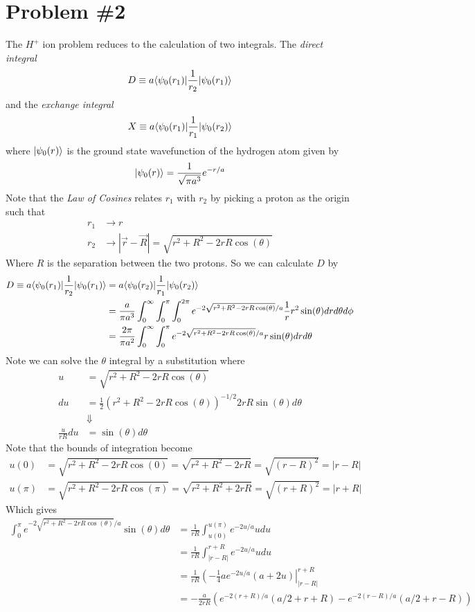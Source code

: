 \documentclass[11pt]{article}
\numberwithin{equation}{section}
\begin{document}
\section{Problem \#2}
The $H^+$ ion problem reduces to the calculation of two integrals. The \emph{direct integral}
$$D\equiv a\langle{\psi_0(r_1)}|\frac{1}{r_2}|{\psi_0(r_1)}\rangle$$
and the \emph{exchange integral}
$$X\equiv a\langle{\psi_0(r_1)}|\frac{1}{r_1}|{\psi_0(r_2)}\rangle$$
where $|{\psi_0(r)}\rangle$ is the ground state wavefunction of the hydrogen atom given by
$$|{\psi_0(r)}\rangle = \frac{1}{\sqrt{\pi a^3}}e^{-r/a}$$
Note that the \emph{Law of Cosines} relates $r_1$ with $r_2$ by picking a proton as the origin such that
\begin{align*}
r_1 &\rightarrow r\\
r_2 &\rightarrow |\vec{r}-\vec{R}| = \sqrt{r^2 + R^2 -2rR\cos(\theta)}
\end{align*}
Where $R$ is the separation between the two protons. So we can calculate $D$ by
\begin{align*}
D\equiv a\langle{\psi_0(r_1)}|\frac{1}{r_2}|{\psi_0(r_1)}\rangle &= a\langle{\psi_0(r_2)}|\frac{1}{r_1}|{\psi_0(r_2)}\rangle\\
&= \frac{a}{\pi a^3}\int_{0}^{\infty}\int_{0}^{\pi}\int_{0}^{2\pi}e^{-2\sqrt{r^2+R^2-2rR\cos(\theta)}/a}\frac{1}{r}r^2\sin(\theta)drd\theta d\phi\\
&= \frac{2\pi}{\pi a^2}\int_{0}^{\infty}\int_{0}^{\pi}e^{-2\sqrt{r^2+R^2-2rR\cos(\theta)}/a}r\sin(\theta)drd\theta 
\end{align*}
Note we can solve the $\theta$ integral by a substitution where
\begin{align*}
u &= \sqrt{r^2+R^2-2rR\cos(\theta)}\\
du &= \frac{1}{2}(r^2+R^2-2rR\cos(\theta))^{-1/2}2rR\sin(\theta)d\theta\\
&\Downarrow\\
\frac{u}{rR}du &= \sin(\theta)d\theta
\end{align*}
Note that the bounds of integration become
\begin{align*}
u(0) &= \sqrt{r^2+R^2-2rR\cos(0)} =  \sqrt{r^2+R^2-2rR} = \sqrt{(r-R)^2} = |r-R|\\
u(\pi) &= \sqrt{r^2+R^2-2rR\cos(\pi)} =  \sqrt{r^2+R^2+2rR} = \sqrt{(r+R)^2} = |r+R|
\end{align*}
Which gives
\begin{align*}
\int_{0}^{\pi}e^{-2\sqrt{r^2+R^2-2rR\cos(\theta)}/a}\sin(\theta)d\theta &= \frac{1}{rR}\int_{u(0)}^{u(\pi)}e^{-2u/a}udu\\
&= \frac{1}{rR}\int_{|r-R|}^{r+R}e^{-2u/a}udu\\
&= \frac{1}{rR}\left(-\frac{1}{4}ae^{-2u/a}(a+2u)\right|_{|r-R|}^{r+R}\\
&= -\frac{a}{2rR}\left(e^{-2(r+R)/a}(a/2+r+R) - e^{-2(r-R)/a}(a/2+r-R)\right)
\end{align*}
\end{document}
